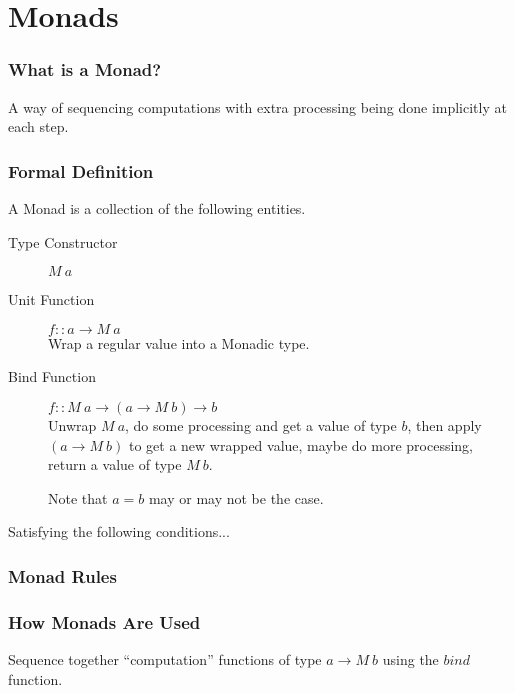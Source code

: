 \documentclass[presentation.tex]{subfiles}
\begin{document}
\section{Monads}
\begin{frame}
  \frametitle{What is a Monad?}

  A way of sequencing computations with extra processing being done
  implicitly at each step.

\end{frame}

\begin{frame}
  \frametitle{Formal Definition}

  A Monad is a collection of the following entities.

  \begin{description}
  \item[Type Constructor]
    $M\ a$

  \item[Unit Function]
    $f::a\rightarrow M\ a$\\
    Wrap a regular value into a Monadic type.

  \item[Bind Function]
    $f::M\ a\rightarrow(a\rightarrow M\ b)\rightarrow b$\\
    Unwrap $M\ a$, do some processing and get a value of type $b$, then
    apply $(a\rightarrow M\ b)$ to get a new wrapped value, maybe do
    more processing, return a value of type $M\ b$.

    Note that $a=b$ may or may not be the case.
  \end{description}

  Satisfying the following conditions...
\end{frame}

\begin{frame}
  \frametitle{Monad Rules}
\end{frame}

\begin{frame}
  \frametitle{How Monads Are Used}

  Sequence together ``computation'' functions of type $a \rightarrow
  M\ b$ using the $bind$ function.
\end{frame}
\end{document}

